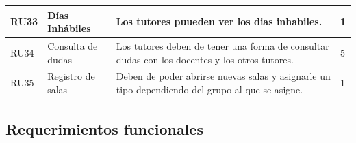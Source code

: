 \documentclass{article}
\begin{document}
\begin{longtable}{|p{1.0cm}|p{3.8cm}|p{5.0cm}|p{1.2cm}|}
	RU33 &
	Días Inhábiles &
	Los tutores puueden ver los dias inhabiles. &
	1
	\\ \hline

	RU34 &
	Consulta de dudas &
	Los tutores deben de tener una forma de consultar dudas con los docentes y los otros tutores.  &
	5
	\\ \hline

	RU35 &
	Registro de salas &
	Deben de poder abrirse nuevas salas y asignarle un tipo dependiendo del grupo al que se asigne. &
	1
	\\ \hline

\end{longtable}

\subsection{Requerimientos funcionales}
\end{document}
